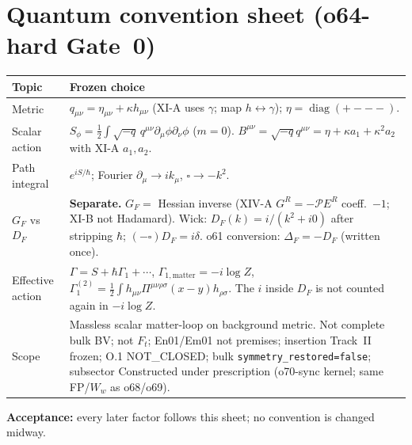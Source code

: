 \section{Quantum convention sheet (o64-hard Gate~0)}
\label{sec:O-qconv}

\begin{center}
\begin{tabular}{@{}p{}p{}@{}}
\toprule
Topic & Frozen choice \\
\midrule
Metric &
$q_{\mu\nu}=\eta_{\mu\nu}+\kappa h_{\mu\nu}$ (XI-A uses $\gamma$; map $h\leftrightarrow\gamma$);
$\eta=\operatorname{diag}(+---)$. \\
Scalar action &
$S_\phi=\tfrac12\int\sqrt{-q}\,q^{\mu\nu}\partial_\mu\phi\partial_\nu\phi$ ($m=0$).
$B^{\mu\nu}=\sqrt{-q}q^{\mu\nu}=\eta+\kappa a_1+\kappa^2 a_2$ with XI-A $a_1,a_2$. \\
Path integral &
$e^{iS/\hbar}$; Fourier $\partial_\mu\to ik_\mu$, $\square\to -k^2$. \\
$G_F$ vs $D_F$ &
\textbf{Separate.} $G_F=$ Hessian inverse (XIV-A $G^R=-\mathcal PE^R$ coeff.~$-1$;
XI-B not Hadamard). Wick: $D_F(k)=i/(k^2+i0)$ after stripping $\hbar$;
$(-\square)D_F=i\delta$. o61 conversion: $\Delta_F=-D_F$ (written once). \\
Effective action &
$\Gamma=S+\hbar\Gamma_1+\cdots$,
$\Gamma_{1,\mathrm{matter}}=-i\log Z$,
$\Gamma_1^{(2)}=\tfrac12\int h_{\mu\nu}\Pi^{\mu\nu\rho\sigma}(x-y)h_{\rho\sigma}$.
The $i$ inside $D_F$ is not counted again in $-i\log Z$. \\
Scope &
Massless scalar matter-loop on background metric.
Not complete bulk BV; not $F_t$; En01/Em01 not premises;
insertion Track~II frozen; O.1 NOT\_CLOSED; bulk \texttt{symmetry\_restored=false};
subsector Constructed under prescription (o70-sync kernel; same FP/$W_w$ as o68/o69). \\
\bottomrule
\end{tabular}
\end{center}

\noindent\textbf{Acceptance:} every later factor follows this sheet; no convention is changed midway.
